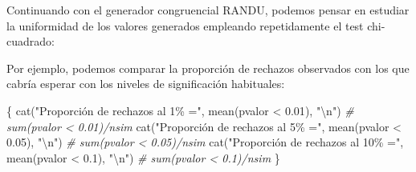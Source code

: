 \documentclass[
]{book}
\newenvironment{Shaded}{\begin{snugshade}}{\end{snugshade}}
\newcommand{\AttributeTok}[1]{\textcolor[rgb]{0.77,0.63,0.00}{#1}}
\newcommand{\CommentTok}[1]{\textcolor[rgb]{0.56,0.35,0.01}{\textit{#1}}}
\newcommand{\ConstantTok}[1]{\textcolor[rgb]{0.00,0.00,0.00}{#1}}
\newcommand{\ControlFlowTok}[1]{\textcolor[rgb]{0.13,0.29,0.53}{\textbf{#1}}}
\newcommand{\DecValTok}[1]{\textcolor[rgb]{0.00,0.00,0.81}{#1}}
\newcommand{\FloatTok}[1]{\textcolor[rgb]{0.00,0.00,0.81}{#1}}
\newcommand{\FunctionTok}[1]{\textcolor[rgb]{0.00,0.00,0.00}{#1}}
\newcommand{\NormalTok}[1]{#1}
\newcommand{\OtherTok}[1]{\textcolor[rgb]{0.56,0.35,0.01}{#1}}
\newcommand{\SpecialCharTok}[1]{\textcolor[rgb]{0.00,0.00,0.00}{#1}}
\newcommand{\StringTok}[1]{\textcolor[rgb]{0.31,0.60,0.02}{#1}}
\theoremstyle{break}
\theoremstyle{definition}
\theoremstyle{definition}
\theoremstyle{definition}
\theoremstyle{definition}
\theoremstyle{remark}
\begin{document}
Continuando con el generador congruencial RANDU, podemos pensar en estudiar la uniformidad de los valores generados empleando repetidamente el test chi-cuadrado:

\begin{Shaded}
\end{Shaded}

Por ejemplo, podemos comparar la proporción de rechazos observados con los que cabría esperar con los niveles de significación habituales:

\begin{Shaded}
\begin{Highlighting}[]
\NormalTok{\{}
\FunctionTok{cat}\NormalTok{(}\StringTok{"Proporción de rechazos al 1\% ="}\NormalTok{, }\FunctionTok{mean}\NormalTok{(pvalor }\SpecialCharTok{\textless{}} \FloatTok{0.01}\NormalTok{), }\StringTok{"}\SpecialCharTok{\textbackslash{}n}\StringTok{"}\NormalTok{) }\CommentTok{\# sum(pvalor \textless{} 0.01)/nsim}
\FunctionTok{cat}\NormalTok{(}\StringTok{"Proporción de rechazos al 5\% ="}\NormalTok{, }\FunctionTok{mean}\NormalTok{(pvalor }\SpecialCharTok{\textless{}} \FloatTok{0.05}\NormalTok{), }\StringTok{"}\SpecialCharTok{\textbackslash{}n}\StringTok{"}\NormalTok{)   }\CommentTok{\# sum(pvalor \textless{} 0.05)/nsim}
\FunctionTok{cat}\NormalTok{(}\StringTok{"Proporción de rechazos al 10\% ="}\NormalTok{, }\FunctionTok{mean}\NormalTok{(pvalor }\SpecialCharTok{\textless{}} \FloatTok{0.1}\NormalTok{), }\StringTok{"}\SpecialCharTok{\textbackslash{}n}\StringTok{"}\NormalTok{)   }\CommentTok{\# sum(pvalor \textless{} 0.1)/nsim}
\NormalTok{\}}
\end{Highlighting}
\end{Shaded}
\end{document}
